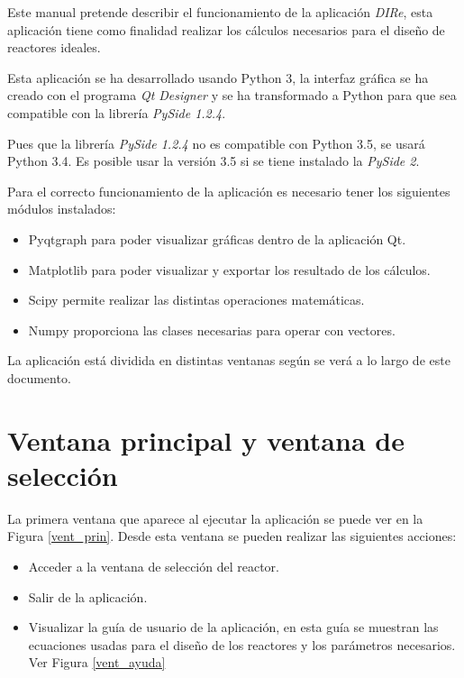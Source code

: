	Este manual pretende describir el funcionamiento de la aplicación \textit{DIRe}, esta aplicación tiene como finalidad realizar los cálculos necesarios para el diseño de reactores ideales.
	
	Esta aplicación se ha desarrollado usando Python 3, la interfaz gráfica se ha creado con el programa \textit{Qt Designer} y se ha transformado a Python para que sea compatible con la librería \textit{PySide 1.2.4}. 
	
	Pues que la librería \textit{PySide 1.2.4} no es compatible con Python 3.5, se usará Python 3.4. Es posible usar la versión 3.5 si se tiene instalado la \textit{PySide 2}.
	
	Para el correcto funcionamiento de la aplicación es necesario tener los siguientes módulos instalados:
	\begin{itemize}
		\item Pyqtgraph para poder visualizar gráficas dentro de la aplicación Qt.
		\item Matplotlib para poder visualizar y exportar los resultado de los cálculos.
		\item Scipy permite realizar las distintas operaciones matemáticas.
		\item Numpy proporciona las clases necesarias para operar con vectores.
	\end{itemize}
	
	
	La aplicación está dividida en distintas ventanas según se verá a lo largo de este documento.
	
\section{Ventana principal y ventana de selección}
	La primera ventana que aparece al ejecutar la aplicación se puede ver en la Figura \ref{vent_prin}. Desde esta ventana se pueden realizar las siguientes acciones:
	\begin{itemize}
		\item Acceder a la ventana de selección del reactor.
		\item Salir de la aplicación.
		\item Visualizar la guía de usuario de la aplicación, en esta guía se muestran las ecuaciones usadas para el diseño de los reactores y los parámetros necesarios. Ver Figura \ref{vent_ayuda}
	\end{itemize}

